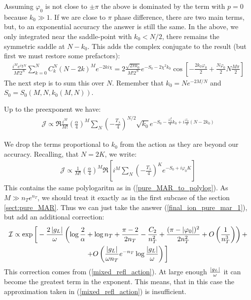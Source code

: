 Assuming $\varphi_{0}$ is not close to $\pm\pi$ the above is dominated
by the term with $p=0$ because $k_{0}\gg1$. If we are close to $\pi$
phase difference, there are two main terms, but, to an exponential
accuracy the answer is still the same.
In the above, we only integrated near the saddle-point with $k_{0}<N/2$,
there remains the symmetric saddle at $N-k_{0}$. This adds the complex
conjugate to the result (but first we must restore some prefactors):
\begin{gather}
\frac{i^{M}e^{i\chi N}}{M!2^{N}}\sum_{k=0}^{N}C_{k}^{N}(N-2k)^{M}e^{-2ki\chi}
=
2\frac{\sqrt{2\pi k_{0}}}{M!2^{N}}
e^{-S_{0}-2\chi^{2}k_{0}}
\cos\left[
-\frac{2k_{0}\varphi_0}{2}
+
\frac{N\varphi_0}{2}
 N\frac{M\pi}{2}\right]
\end{gather}
The next step is to sum this over $N$. Remember that $k_{0}=Ne^{-2M/N}$
and $S_{0}=S_{0}(M,N,k_{0}(M,N))$. 

Up to the preexponent we have:
\begin{gather}
	\mathcal{J}
	\propto
	\Re\frac{i^{M}}{M!}\left(\frac{\alpha}{4}\right)^{M}\sum_{N}\left(-\frac{T_{\lambda}}{4}\right)^{N/2}\sqrt{k_{0}}e^{-S_{0}-\frac{\varphi_0^2}{4}k_{0}+i\frac{\varphi_0}{2}(N-2k_{0})}
\end{gather}

We drop the terms proportional to $ k_0 $ from the action as they are beyond our accuracy. Recalling, that $ N=2K $, we write:
\begin{gather}
	\mathcal{J}
	\propto
	\frac{1}{M!}
	\left(\frac{\alpha}{4}\right)^{M}\Re
	\left[ i^{M}
	\sum_{N}
	\left(-\frac{T_{\lambda}}{4}\right)^{K}
	e^{-S_{0}+i\varphi_{0}K}
	\right]
\end{gather}
This contains the same polylogaritm as in (\ref{pure_MAR_to_polylog}). As $ M\gg n_Te^{n_T} $, we should treat it exactly as in the first subcase of the section \ref{sect:pure_MAR}. Thus we can just take the answer (\ref{final_ion_pure_mar_1}), but add an additional correction:
\begin{multline}
\label{final_ionization_andreev_normal}
		\mathcal{I}
	\propto
	\exp
	\bigg[
		-
		\frac
		{2\left|g_L\right|}
		{\omega}
		\left(
			\log
			\frac{2}{\alpha}
			+
			\log n_T
			+
			\frac{\pi-2}{2n_T}
			-
			\frac{C_2}{n_T^2}
			+
			\frac{(\pi-|\varphi_{0}|)^{2}}{2n_T^{2}}
			+
			O\left(\frac{1}{n_T^3}\right)
		\right)
	+
	\\
	+
	O
	\left( 		\frac{\left|g_L\right|}{\omega n_T}
			e^{-n_T}
			\log\frac{\left|g_L\right|}{\omega}
	\right)		
	\bigg]
\end{multline}
This correction comes from (\ref{mixed_refl_action}). At large enough $ \frac{\left|g_L\right|}{\omega} $ it can become the greatest term in the exponent. This means, that in this case the approximation taken in (\ref{mixed_refl_action}) is insufficient.  


